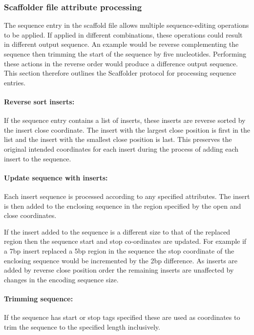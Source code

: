 \documentclass[10pt]{bmc_article}
\newenvironment{bmcformat}{\begin{raggedright}\baselineskip20pt\sloppy\setboolean{publ}{false}}{\end{raggedright}\baselineskip20pt\sloppy}
\begin{document}
\begin{bmcformat}
\subsubsection*{Scaffolder file attribute processing} %

The sequence entry in the scaffold file allows multiple sequence-editing
operations to be applied. If applied in different combinations, these
operations could result in different output sequence. An example would be
reverse complementing the sequence then trimming the start of the sequence by
five nucleotides. Performing these actions in the reverse order would produce
a difference output sequence. This section therefore outlines the Scaffolder
protocol for processing sequence entries. \pb

\paragraph{Reverse sort inserts:} If the sequence entry contains a list of
inserts, these inserts are reverse sorted by the insert close coordinate. The
insert with the largest close position is first in the list and the insert
with the smallest close position is last. This preserves the original intended
coordinates for each insert during the process of adding each insert to the
sequence. \pb

\paragraph{Update sequence with inserts:} Each insert sequence is processed
according to any specified attributes. The insert is then added to the
enclosing sequence in the region specified by the open and close coordinates.
\pb

If the insert added to the sequence is a different size to that of the
replaced region then the sequence start and stop co-ordinates are updated. For
example if a 7bp insert replaced a 5bp region in the sequence the stop
coordinate of the enclosing sequence would be incremented by the 2bp
difference. As inserts are added by reverse close position order the remaining
inserts are unaffected by changes in the encoding sequence size. \pb

\paragraph{Trimming sequence:} If the sequence has start or stop tags
specified these are used as coordinates to trim the sequence to the specified
length inclusively. \pb 


\end{bmcformat}
\end{document}
